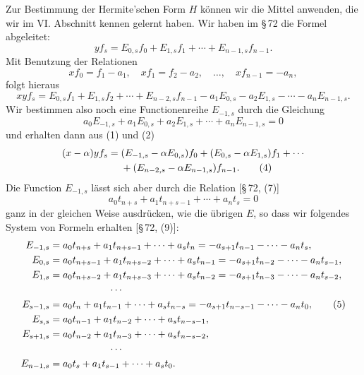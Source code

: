 \documentclass[11pt]{article}
\begin{document}
Zur Bestimmung der Hermite'schen Form $H$ können wir die Mittel anwenden, die wir im VI. Abschnitt kennen gelernt haben. Wir haben im \S\,72 die Formel abgeleitet:
\begin{equation}
yf_s=E_{0,s}f_0+E_{1,s}f_1+\cdots+E_{n-1,s}f_{n-1}.
\tag{1}
\end{equation}
Mit Benutzung der Relationen
\[
        xf_0=f_1-a_1,
        \quad xf_1=f_2-a_2,
        \quad\ldots,
        \quad xf_{n-1}=-a_n,
\]
folgt hieraus
\begin{equation}
xyf_s=E_{0,s}f_1+E_{1,s}f_2+\cdots+E_{n-2,s}f_{n-1}
       -a_1E_{0,s}-a_2E_{1,s}-\cdots-a_nE_{n-1,s}.
\tag{2}
\end{equation}
Wir bestimmen also noch eine Functionenreihe $E_{-1,s}$ durch die Gleichung
\begin{equation}
a_0E_{-1,s}+a_1E_{0,s}+a_2E_{1,s}+\cdots+a_nE_{n-1,s}=0
\tag{3}
\end{equation}
und erhalten dann aus (1) und (2)
\begin{align}
(x-\alpha)yf_s={}&(E_{-1,s}-\alpha E_{0,s})f_0+(E_{0,s}-\alpha E_{1,s})f_1+\cdots\notag\\
&+(E_{n-2,s}-\alpha E_{n-1,s})f_{n-1}.
\tag{4}
\end{align}
Die Function $E_{-1,s}$ lässt sich aber durch die Relation [\S\,72, (7)]
\[
        a_0t_{n+s}+a_1t_{n+s-1}+\cdots+a_nt_s=0
\]
ganz in der gleichen Weise ausdrücken, wie die übrigen $E$, so dass wir folgendes System von Formeln erhalten [\S\,72, (9)]:
\begin{align}
E_{-1,s}&=a_0t_{n+s}+a_1t_{n+s-1}+\cdots+a_st_n
          =-a_{s+1}t_{n-1}-\cdots-a_nt_s,\notag\\
E_{0,s}&=a_0t_{n+s-1}+a_1t_{n+s-2}+\cdots+a_st_{n-1}
          =-a_{s+1}t_{n-2}-\cdots-a_nt_{s-1},\notag\\
E_{1,s}&=a_0t_{n+s-2}+a_1t_{n+s-3}+\cdots+a_st_{n-2}
          =-a_{s+1}t_{n-3}-\cdots-a_nt_{s-2},\notag\\
&\hspace{6em}\cdots\notag\\
E_{s-1,s}&=a_0t_n+a_1t_{n-1}+\cdots+a_st_{n-s}
          =-a_{s+1}t_{n-s-1}-\cdots-a_nt_0,\tag{5}\\
E_{s,s}&=a_0t_{n-1}+a_1t_{n-2}+\cdots+a_st_{n-s-1},\notag\\
E_{s+1,s}&=a_0t_{n-2}+a_1t_{n-3}+\cdots+a_st_{n-s-2},\notag\\
&\hspace{6em}\cdots\notag\\
E_{n-1,s}&=a_0t_s+a_1t_{s-1}+\cdots+a_st_0.
\notag
\end{align}
\end{document}
